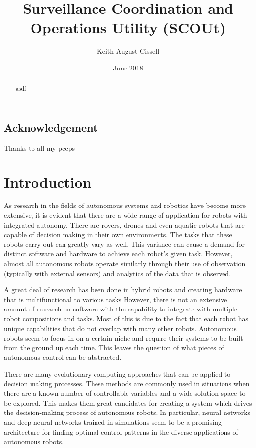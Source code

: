 \documentclass[]{report}
\begin{document}
\title{Surveillance Coordination and Operations Utility (SCOUt)}
\author{Keith August Cissell}
\date{June 2018}

\maketitle

\begin{abstract}
  asdf
\end{abstract}

\section*{Acknowledgement}
Thanks to all my peeps

\tableofcontents
\newpage



\chapter{Introduction}
As research in the fields of autonomous systems and robotics have become more extensive, it is evident that there are a wide range of application for robots with integrated autonomy.
There are rovers, drones and even aquatic robots that are capable of decision making in their own environments.
The tasks that these robots carry out can greatly vary as well.
This variance can cause a demand for distinct software and hardware to achieve each robot’s given task.
However, almost all autonomous robots operate similarly through their use of observation (typically with external sensors) and analytics of the data that is observed.

A great deal of research has been done in hybrid robots and creating hardware that is multifunctional to various tasks
However, there is not an extensive amount of research on software with the capability to integrate with multiple robot compositions and tasks.
Most of this is due to the fact that each robot has unique capabilities that do not overlap with many other robots.
Autonomous robots seem to focus in on a certain niche and require their systems to be built from the ground up each time.
This leaves the question of what pieces of autonomous control can be abstracted.

There are many evolutionary computing approaches that can be applied to decision making processes.
These methods are commonly used in situations when there are a known number of controllable variables and a wide solution space to be explored.
This makes them great candidates for creating a system which drives the decision-making process of autonomous robots.
In particular, neural networks and deep neural networks trained in simulations seem to be a promising architecture for finding optimal control patterns in the diverse applications of autonomous robots.
\end{document}
